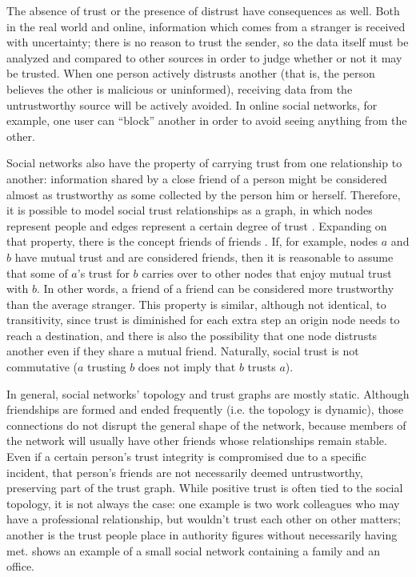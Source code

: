 The absence of trust or the presence of distrust have consequences as well.
Both in the real world and online, information which comes from a stranger is received with uncertainty; there is no reason to trust the sender, so the data itself must be analyzed and compared to other sources in order to judge whether or not it may be trusted.
When one person actively distrusts another (that is, the person believes the other is malicious or uninformed), receiving data from the untrustworthy source will be actively avoided.
In online social networks, for example, one user can ``block'' another in order to avoid seeing anything from the other.


Social networks also have the property of carrying trust from one relationship to another:
information shared by a close friend of a person might be considered almost as trustworthy as some collected by the person him or herself.
Therefore, it is possible to model social trust relationships as a graph, in which nodes represent people and edges represent a certain degree of trust \citep{newmannetworks}.
Expanding on that property, there is the concept friends of friends \citep{boissevain1974friends}.
If, for example, nodes $a$ and $b$ have mutual trust and are considered friends, then it is reasonable to assume that some of $a$'s trust for $b$ carries over to other nodes that enjoy mutual trust with $b$.
In other words, a friend of a friend can be considered more trustworthy than the average stranger.
This property is similar, although not identical, to transitivity, since trust is diminished for each extra step an origin node needs to reach a destination, and there is also the possibility that one node distrusts another even if they share a mutual friend.
Naturally, social trust is not commutative ($a$ trusting $b$ does not imply that $b$ trusts $a$).

In general, social networks' topology and trust graphs are mostly static.
Although friendships are formed and ended frequently (i.e. the topology is dynamic), those connections do not disrupt the general shape of the network, because members of the network will usually have other friends whose relationships remain stable.
Even if a certain person's trust integrity is compromised due to a specific incident, that person's friends are not necessarily deemed untrustworthy, preserving part of the trust graph.
While positive trust is often tied to the social topology, it is not always the case: one example is two work colleagues who may have a professional relationship, but wouldn't trust each other on other matters; another is the trust people place in authority figures without necessarily having met. 
 shows an example of a small social network containing a family and an office. 

